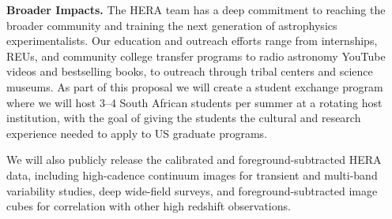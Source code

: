 \documentclass[preprint]{aastex}
\begin{document}
\vspace{.25 cm}
\noindent
{\bf Broader Impacts.}
The HERA team has a deep commitment to reaching the broader community and training the next generation of astrophysics experimentalists. Our education and outreach efforts range from internships, REUs, and community college transfer programs
to radio astronomy YouTube videos and bestselling books, to outreach through tribal centers and science museums. 
As part of this proposal we will create a student exchange program where we will host 3--4 South African students per summer at a rotating host institution, with the goal of giving the students the cultural and research experience needed to apply to US graduate programs. 

We will also publicly release the calibrated and foreground-subtracted HERA data, including high-cadence continuum images for transient and multi-band variability studies, deep wide-field surveys, 
and foreground-subtracted image cubes for correlation with other high redshift observations.

%
%

\end{document}
